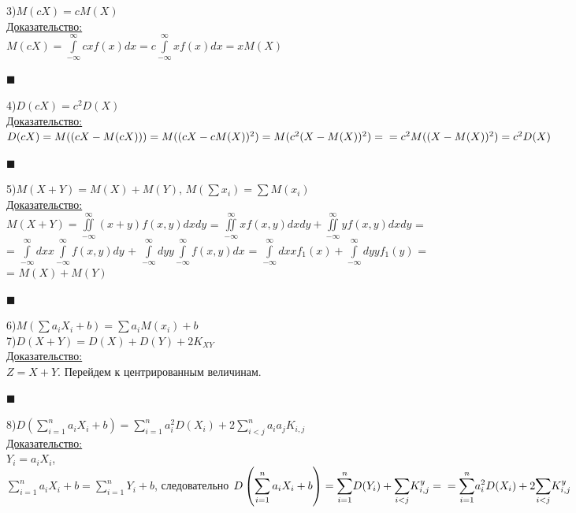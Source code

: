 \documentclass[russian, 12pt, fleqn,x11names]{article}
\begin{document}
3)$M(cX) = cM(X)$\\
\underline{Доказательство:}\\
$M(cX) = \displaystyle{\int\limits_{-\infty} ^{\infty}} c x f(x) dx = c \displaystyle{\int \limits_{-\infty} ^{\infty}} x f(x) dx = xM(X)$
\begin{flushright}\(\blacksquare\)\end{flushright}
4)$D(cX) = c^2 D(X)$\\
\underline{Доказательство:}\\
$D(cX)=M((cX - M(cX))) = M((cX - c M(X))^2) = M(c^2(X-M(X))^2) =\\= c^2M((X-M(X))^2) = c^2 D(X)$
\begin{flushright}\(\blacksquare\)\end{flushright}
5)$M(X+Y) = M(X) + M(Y)$,  $M(\sum x_i) = \sum M(x_i)$\\
\underline{Доказательство:}\\
$M(X + Y) =  \displaystyle{\iint \limits_{-\infty} ^{\infty}} (x+y)f(x,y) dxdy$ = $\displaystyle{\iint \limits_{-\infty} ^{\infty}} xf(x,y) dxdy + \displaystyle{\iint \limits_{-\infty} ^{\infty}} yf(x,y) dxdy$ =\\= $\displaystyle{\int\limits_{-\infty}^{\infty} } dx x \displaystyle{\int\limits_{-\infty}^{\infty} } f(x, y) dy $ +  $\displaystyle{\int\limits_{-\infty}^{\infty} } dy y \displaystyle{\int\limits_{-\infty}^{\infty} } f(x, y) dx $ = $\displaystyle{\int\limits_{-\infty}^{\infty} } dx x f_1(x) + \displaystyle{\int\limits_{-\infty}^{\infty} } dyy f_1(y)$ =\\= $M(X) + M(Y)$
\begin{flushright}\(\blacksquare\)\end{flushright}
6)$M(\sum \limits a_i X_i + b) = \sum \limits a_i M(x_i) + b$\\
7)$D(X + Y) = D(X) + D(Y) + 2 K_{XY}$\\
\underline{Доказательство:}\\
$Z=X+Y$. Перейдем к центрированным величинам.
\begin{flushright}\(\blacksquare\)\end{flushright}
8)$\displaystyle{D\left (\sum_{i = 1}^{n}a_iX_i + b\right )} =  \displaystyle{\sum_{i = 1}^{n}}  a_i^2 D(X_i) + 2 \displaystyle{\sum_{i <j}^{n}}a_ia_jK_{i,j}$\\
\underline{Доказательство:}\\
$Y_i = a_i X_i$,\\
 $ \displaystyle{\sum_{i = 1}^{n}}a_iX_i + b =  \displaystyle{\sum_{i = 1}^{n}}Y_i + b$, следовательно  $\displaystyle{D\left (\sum_{i = 1}^{n}a_iX_i + b\right )}  = \displaystyle{\sum_{i = 1}^{n}} D(Y_i) + \displaystyle{\sum_{i < j}^{}} K_{i,j} ^y =\\= \displaystyle{\sum_{i = 1}^{n}}a_i^2D(X_i) + 2 \displaystyle{\sum_{i  < j}} K_{i,j}^{y}$
\end{document}
